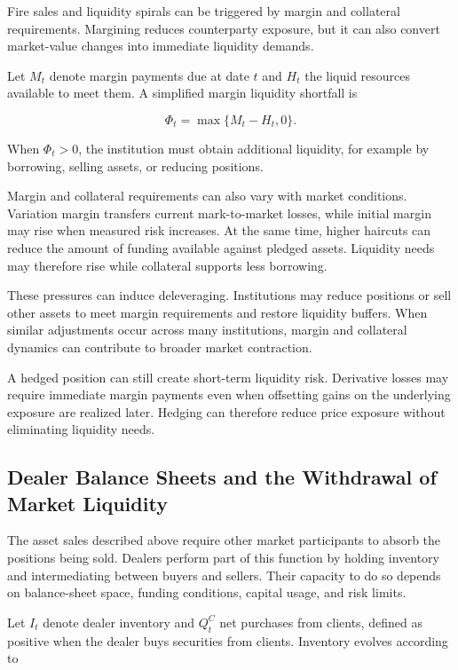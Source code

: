 Fire sales and liquidity spirals can be triggered by margin and collateral requirements. Margining reduces counterparty exposure, but it can also convert market-value changes into immediate liquidity demands.

Let \(M_t\) denote margin payments due at date \(t\) and \(H_t\) the liquid resources available to meet them. A simplified margin liquidity shortfall is

\begin{equation}
\Phi_t
=
\max\{M_t-H_t,0\}.
\label{eq:ch21-margin-shortfall}
\end{equation}

When \(\Phi_t>0\), the institution must obtain additional liquidity, for example by borrowing, selling assets, or reducing positions.

Margin and collateral requirements can also vary with market conditions. Variation margin transfers current mark-to-market losses, while initial margin may rise when measured risk increases. At the same time, higher haircuts can reduce the amount of funding available against pledged assets. Liquidity needs may therefore rise while collateral supports less borrowing.

These pressures can induce deleveraging. Institutions may reduce positions or sell other assets to meet margin requirements and restore liquidity buffers. When similar adjustments occur across many institutions, margin and collateral dynamics can contribute to broader market contraction.

A hedged position can still create short-term liquidity risk. Derivative losses may require immediate margin payments even when offsetting gains on the underlying exposure are realized later. Hedging can therefore reduce price exposure without eliminating liquidity needs.


\subsection{Dealer Balance Sheets and the Withdrawal of Market Liquidity}

The asset sales described above require other market participants to absorb the positions being sold. Dealers perform part of this function by holding inventory and intermediating between buyers and sellers. Their capacity to do so depends on balance-sheet space, funding conditions, capital usage, and risk limits.

Let \(I_t\) denote dealer inventory and \(Q_t^C\) net purchases from clients, defined as positive when the dealer buys securities from clients. Inventory evolves according to

